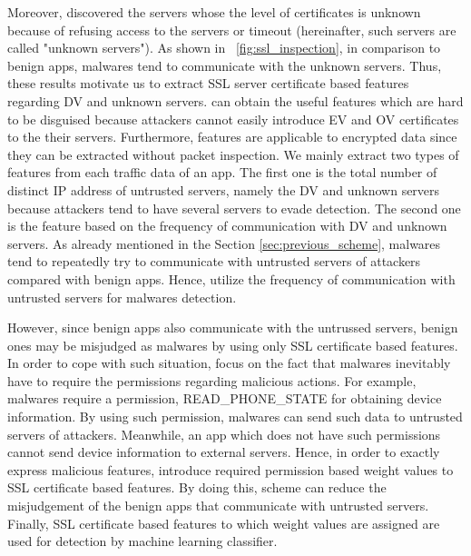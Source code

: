Moreover, \we discovered the servers whose the level of certificates is unknown because of refusing access to the servers or timeout (hereinafter, such servers are called "unknown servers").
As shown in \figurename~\ref{fig:ssl_inspection}, in comparison to benign apps, malwares tend to communicate with the unknown servers.
Thus, these results motivate us to extract SSL server certificate based features regarding DV and unknown servers.
\We can obtain the useful features which are hard to be disguised because attackers cannot easily introduce EV and OV certificates to the their servers.
Furthermore, \our features are applicable to encrypted data since they can be extracted without packet inspection.
We mainly extract two types of features from each traffic data of an app.
The first one is the total number of distinct IP address of untrusted servers, namely the DV and unknown servers because attackers tend to have several servers to evade detection.  
The second one is the feature based on the frequency of communication with DV and unknown servers.
As already mentioned in the Section \ref{sec:previous_scheme}, malwares tend to repeatedly try to communicate with untrusted servers of attackers compared with benign apps.
Hence, \we utilize the frequency of communication with untrusted servers for malwares detection.  

However, since benign apps also communicate with the untrussed servers, benign ones may be misjudged as malwares by using only SSL certificate based features.
In order to cope with such situation, \we focus on the fact that malwares inevitably have to require the permissions regarding malicious actions.
For example, malwares require a permission, READ\_PHONE\_STATE for obtaining device information.
By using such permission, malwares can send such data to untrusted servers of attackers.
Meanwhile, an app which does not have such permissions cannot send device information to external servers.
Hence, in order to exactly express malicious features, \we introduce required permission based weight values to SSL certificate based features.
By doing this, \our scheme can reduce the misjudgement of the benign apps that communicate with untrusted servers.
Finally, SSL certificate based features to which weight values are assigned are used for detection by machine learning classifier.

